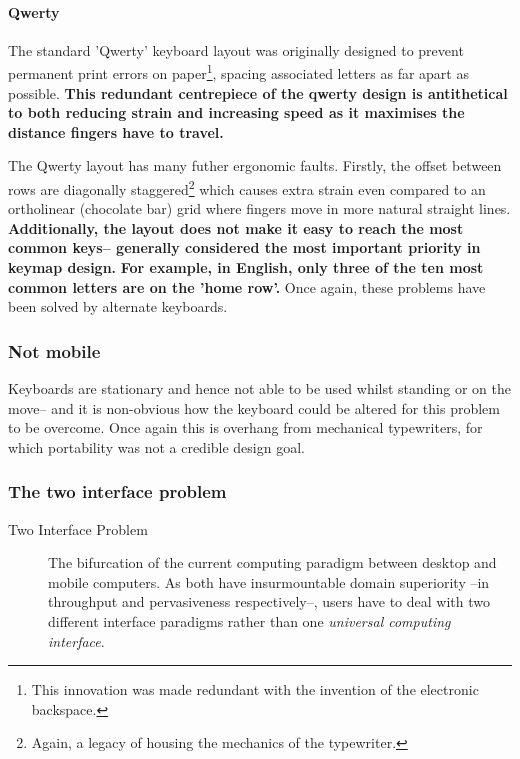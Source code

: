 \documentclass[logo,bsc,singlespacing,parskip]{infthesis}
\begin{document}
\paragraph{Qwerty}
\label{sec:orgf1d9fe3}
The standard 'Qwerty' keyboard layout was originally designed to prevent permanent print errors on paper\footnote{This innovation was made redundant with the invention of the electronic backspace.}, spacing associated letters as far apart as possible.
\textbf{This redundant centrepiece of the qwerty design is antithetical to both reducing strain and increasing speed as it maximises the distance fingers have to travel.}

The Qwerty layout has many futher ergonomic faults.
Firstly, the offset between rows are diagonally staggered\footnote{Again, a legacy of housing the mechanics of the typewriter.} which causes extra strain even compared to an ortholinear (chocolate bar) grid where fingers move in more natural straight lines.
\textbf{Additionally, the layout does not make it easy to reach the most common keys-- generally considered the most important priority in keymap design.}
\textbf{For example, in English, only three of the ten most common letters are on the 'home row'.}
Once again, these problems have been solved by alternate keyboards.
\subsubsection{Not mobile}
\label{sec:org47d65a3}
Keyboards are stationary and hence not able to be used whilst standing or on the move-- and it is non-obvious how the keyboard could be altered for this problem to be overcome.
Once again this is overhang from mechanical typewriters, for which portability was not a credible design goal.

\subsubsection{The two interface problem}
\label{sec:org7631ef3}
\medskip
\begin{mdframed}
\begin{description}
\item[{Two Interface Problem\label{two interface problem}}] The bifurcation of the current computing paradigm between desktop and mobile computers.
As both have insurmountable domain superiority --in throughput and pervasiveness respectively--, users have to deal with two different interface paradigms rather than one \emph{universal computing interface}.
\end{description}
\end{mdframed}
\end{document}
